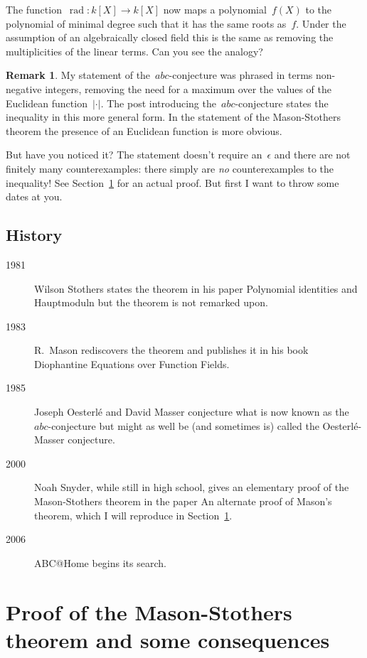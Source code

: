\documentclass[11pt, a4paper, openany, oneside, article]{memoir}
\theoremstyle{definition}
\newtheorem{remark}[theorem]{Remark}
\DeclareMathOperator\rad{rad}
\begin{document}
The function~$\rad\colon k[X]\to k[X]$ now maps a polynomial~$f(X)$ to the polynomial of minimal degree such that it has the same roots as~$f$. Under the assumption of an algebraically closed field this is the same as removing the multiplicities of the linear terms. Can you see the analogy?

\begin{remark}
  My statement of the~$abc$\nobreakdash-conjecture was phrased in terms non-negative integers, removing the need for a maximum over the values of the Euclidean function~$|\cdot|$. The post introducing the~$abc$\nobreakdash-conjecture states the inequality in this more general form. In the statement of the Mason-Stothers theorem the presence of an Euclidean function is more obvious.
\end{remark}

But have you noticed it? The statement doesn't require an~$\epsilon$ and there are not finitely many counterexamples: there simply are \emph{no} counterexamples to the inequality! See Section~\ref{section:proof-and-consequences} for an actual proof. But first I want to throw some dates at you.

\subsection{History}

\begin{description}
  \item[1981] Wilson Stothers states the theorem in his paper Polynomial identities and Hauptmoduln but the theorem is not remarked upon.
  \item[1983] R.\ Mason rediscovers the theorem and publishes it in his book Diophantine Equations over Function Fields.
  \item[1985] Joseph Oesterl\'e and David Masser conjecture what is now known as the~$abc$\nobreakdash-conjecture but might as well be (and sometimes is) called the Oesterl\'e-Masser conjecture.
  \item[2000] Noah Snyder, while still in high school, gives an elementary proof of the Mason-Stothers theorem in the paper An alternate proof of Mason's theorem, which I will reproduce in Section~\ref{section:proof-and-consequences}.
  \item[2006] ABC@Home begins its search.
\end{description}

\clearpage


\section{Proof of the Mason-Stothers theorem and some consequences}
\label{section:proof-and-consequences}
\end{document}
